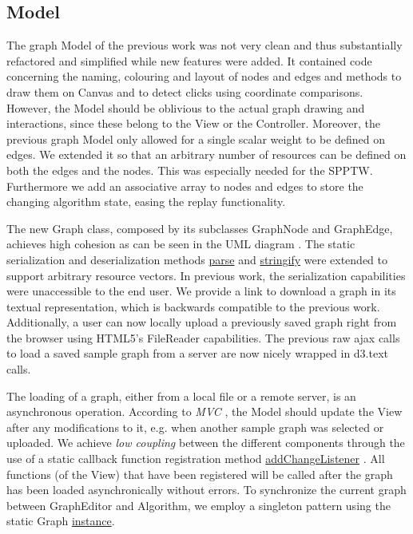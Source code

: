 \subsection{Model}
The graph Model of the previous work was not very clean and thus substantially refactored and simplified while new features were added. It contained code concerning the naming, colouring and layout of nodes and edges and methods to draw them on Canvas and to detect clicks using coordinate comparisons. However, the Model should be oblivious to the actual graph drawing and interactions, since these belong to the View or the Controller. Moreover, the previous graph Model only allowed for a single scalar weight to be defined on edges. We extended it so that an arbitrary number of resources can be defined on both the edges and the nodes. This was especially needed for the SPPTW. Furthermore we add an associative array to nodes and edges to store the changing algorithm state, easing the replay functionality.

The new Graph class, composed by its subclasses GraphNode and GraphEdge, achieves high cohesion as can be seen in the UML diagram . The static serialization and deserialization methods \underline{parse} and \underline{stringify} were extended to support arbitrary resource vectors. In previous work, the serialization capabilities were unaccessible to the end user. We provide a link to download a graph in its textual representation, which is backwards compatible to the previous work. Additionally, a user can now locally upload a previously saved graph right from the browser using HTML5's FileReader capabilities. The previous raw ajax calls to load a saved sample graph from a server are now nicely wrapped in d3.text calls.

The loading of a graph, either from a local file or a remote server, is an asynchronous operation. According to \textit{MVC} , the Model should update the View after any modifications to it, e.g. when another sample graph was selected or uploaded. We achieve \textit{low coupling}  between the different components through the use of a static callback function registration method \underline{addChangeListener} . All functions (of the View) that have been registered will be called after the graph has been loaded asynchronically without errors. To synchronize the current graph between GraphEditor and Algorithm, we employ a singleton pattern using the static Graph \underline{instance}.


